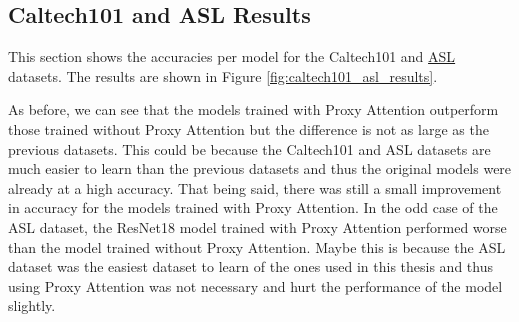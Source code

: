\subsection{Caltech101 and ASL Results}
This section shows the accuracies per model for the Caltech101 \cite{liCaltech101} and \href{https://www.kaggle.com/datasets/grassknoted/asl-alphabet}{ASL} datasets. The results are shown in Figure \ref{fig:caltech101_asl_results}.

As before, we can see that the models trained with Proxy Attention outperform those trained without Proxy Attention but the difference is not as large as the previous datasets. This could be because the Caltech101 and ASL datasets are much easier to learn than the previous datasets and thus the original models were already at a high accuracy. That being said, there was still a small improvement in accuracy for the models trained with Proxy Attention. In the odd case of the ASL dataset, the ResNet18 model trained with Proxy Attention performed worse than the model trained without Proxy Attention. Maybe this is because the ASL dataset was the easiest dataset to learn of the ones used in this thesis and thus using Proxy Attention was not necessary and hurt the performance of the model slightly.

